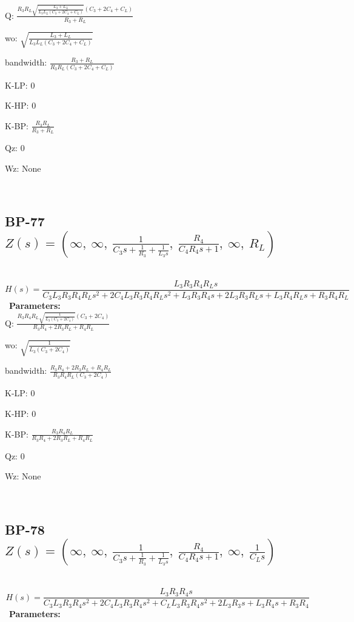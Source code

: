 \documentclass{article}
\begin{document}
Q: $\frac{R_{3} R_{L} \sqrt{\frac{L_{3} + L_{L}}{L_{3} L_{L} \left(C_{3} + 2 C_{4} + C_{L}\right)}} \left(C_{3} + 2 C_{4} + C_{L}\right)}{R_{3} + R_{L}}$\ 

wo: $\sqrt{\frac{L_{3} + L_{L}}{L_{3} L_{L} \left(C_{3} + 2 C_{4} + C_{L}\right)}}$\ 

bandwidth: $\frac{R_{3} + R_{L}}{R_{3} R_{L} \left(C_{3} + 2 C_{4} + C_{L}\right)}$\ 

K-LP: $0$\ 

K-HP: $0$\ 

K-BP: $\frac{R_{3} R_{L}}{R_{3} + R_{L}}$\ 

Qz: $0$\ 

Wz: $\text{None}$\ 

\ 

\subsection{BP-77 $Z(s) = \left( \infty, \  \infty, \  \frac{1}{C_{3} s + \frac{1}{R_{3}} + \frac{1}{L_{3} s}}, \  \frac{R_{4}}{C_{4} R_{4} s + 1}, \  \infty, \  R_{L}\right)$ } \ 
\textbf{\[H(s) = \frac{L_{3} R_{3} R_{4} R_{L} s}{C_{3} L_{3} R_{3} R_{4} R_{L} s^{2} + 2 C_{4} L_{3} R_{3} R_{4} R_{L} s^{2} + L_{3} R_{3} R_{4} s + 2 L_{3} R_{3} R_{L} s + L_{3} R_{4} R_{L} s + R_{3} R_{4} R_{L}}\] } \ 
\textbf{Parameters:}\\ 

Q: $\frac{R_{3} R_{4} R_{L} \sqrt{\frac{1}{L_{3} \left(C_{3} + 2 C_{4}\right)}} \left(C_{3} + 2 C_{4}\right)}{R_{3} R_{4} + 2 R_{3} R_{L} + R_{4} R_{L}}$\ 

wo: $\sqrt{\frac{1}{L_{3} \left(C_{3} + 2 C_{4}\right)}}$\ 

bandwidth: $\frac{R_{3} R_{4} + 2 R_{3} R_{L} + R_{4} R_{L}}{R_{3} R_{4} R_{L} \left(C_{3} + 2 C_{4}\right)}$\ 

K-LP: $0$\ 

K-HP: $0$\ 

K-BP: $\frac{R_{3} R_{4} R_{L}}{R_{3} R_{4} + 2 R_{3} R_{L} + R_{4} R_{L}}$\ 

Qz: $0$\ 

Wz: $\text{None}$\ 

\ 

\subsection{BP-78 $Z(s) = \left( \infty, \  \infty, \  \frac{1}{C_{3} s + \frac{1}{R_{3}} + \frac{1}{L_{3} s}}, \  \frac{R_{4}}{C_{4} R_{4} s + 1}, \  \infty, \  \frac{1}{C_{L} s}\right)$ } \ 
\textbf{\[H(s) = \frac{L_{3} R_{3} R_{4} s}{C_{3} L_{3} R_{3} R_{4} s^{2} + 2 C_{4} L_{3} R_{3} R_{4} s^{2} + C_{L} L_{3} R_{3} R_{4} s^{2} + 2 L_{3} R_{3} s + L_{3} R_{4} s + R_{3} R_{4}}\] } \ 
\textbf{Parameters:}\\ 
\end{document}
